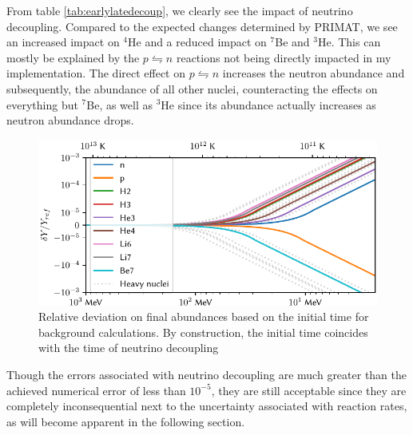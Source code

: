 From table \ref{tab:earlylatedecoup}, we clearly see the impact of neutrino decoupling. Compared to the expected changes determined by PRIMAT\cite{PRIMAT}, we see an increased impact on ${}^4$He and a reduced impact on ${}^7$Be and ${}^3$He. This can mostly be explained by the $p\leftrightharpoons n$ reactions not being directly impacted in my implementation. The direct effect on $p\leftrightharpoons n$ increases the neutron abundance and subsequently, the abundance of all other nuclei, counteracting the effects on everything but ${}^7$Be, as well as ${}^3$He since its abundance actually increases as neutron abundance drops.%
\begin{figure}[ht]
    \includegraphics[width=5.1in]{figures/initime.pdf}
    \caption{Relative deviation on final abundances based on the initial time for background calculations. By construction, the initial time coincides with the time of neutrino decoupling}
    \label{fig:initime}
\end{figure}

Though the errors associated with neutrino decoupling are much greater than the achieved numerical error of less than $10^{-5}$, they are still acceptable since they are completely inconsequential next to the uncertainty associated with reaction rates, as will become apparent in the following section.


